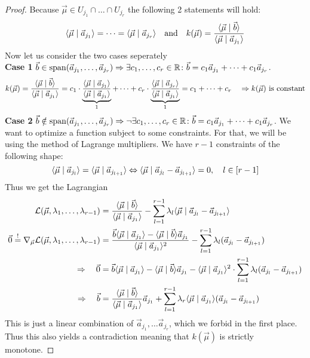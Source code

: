 \begin{proof}
    Because $\vec \mu \in U_{j_1}\cap \dots\cap U_{j_r}$ the following 2 statements will hold:
    $$\langle \vec{\mu} \mid \vec a_{j_1} \rangle = \dots = \langle \vec{\mu} \mid \vec a_{j_r} \rangle \quad\textrm{and}\quad k(\vec\mu) = \frac{\langle \vec \mu \mid \vec b \rangle}{\langle \vec \mu \mid \vec a_{j_1} \rangle}$$
    Now let us consider the two cases seperately\\
    \textbf{Case 1} $\vec b \in \operatorname{span}(\vec a_{j_1}, \dots, \vec a_{j_r}) \Rightarrow\exists c_1, \dots, c_r \in \mathbb{R}\colon \vec b = c_1\vec a_{j_1} + \dots + c_1\vec a_{j_r}$.
    $$k(\vec\mu) = \frac{\langle \vec \mu \mid \vec b \rangle}{\langle \vec \mu \mid \vec a_{j_1} \rangle} = c_1 \cdot \underbrace{\frac{\langle \vec \mu \mid \vec a_{j_1} \rangle}{\langle \vec \mu \mid \vec a_{j_1} \rangle}}_1 + \dots + c_r \cdot \underbrace{\frac{\langle \vec \mu \mid \vec a_{j_r} \rangle}{\langle \vec \mu \mid \vec a_{j_1} \rangle}}_1 = c_1 + \dots + c_r \quad \Rightarrow k(\vec\mu)\textrm{ is constant}$$
    \textbf{Case 2} $\vec b \notin \operatorname{span}(\vec a_{j_1}, \dots, \vec a_{j_r}) \Rightarrow\lnot\exists c_1, \dots, c_r \in \mathbb{R}\colon \vec b = c_1\vec a_{j_1} + \dots + c_1\vec a_{j_r}$. We want to optimize a function subject to some constraints. For that, we will be using the method of Lagrange multipliers. We have $r-1$ constraints of the following shape:
    $$\langle \vec\mu \mid \vec a_{j_l} \rangle = \langle \vec\mu \mid \vec a_{j_{l+1}} \rangle \Leftrightarrow \langle \vec\mu \mid \vec a_{j_l} - \vec a_{j_{l+1}} \rangle = 0, \quad l \in [r-1]$$
    Thus we get the Lagrangian
    \begin{align*}
        \mathcal{L}(\vec\mu, \lambda_1, \dots, \lambda_{r-1}) &= \frac{\langle \vec \mu \mid \vec b \rangle}{\langle \vec \mu \mid \vec a_{j_1} \rangle} - \sum_{l=1}^{r-1}\lambda_l \langle \vec\mu \mid \vec a_{j_l} - \vec a_{j_{l+1}} \rangle\\
        \vec0 \stackrel{!}{=}\nabla_{\vec \mu} \mathcal{L}(\vec\mu, \lambda_1, \dots, \lambda_{r-1}) &= \frac{\vec b\langle \vec\mu \mid \vec a_{j_{1}} \rangle - \langle \vec\mu \mid \vec b \rangle\vec a_{j_{1}}}{\langle \vec\mu \mid \vec a_{j_{1}} \rangle^2} - \sum_{l=1}^{r-1}\lambda_l(\vec a_{j_l} - \vec a_{j_{l+1}}) \\
        \Rightarrow\quad \vec0 &= \vec b\langle \vec\mu \mid \vec a_{j_{1}} \rangle - \langle \vec\mu \mid \vec b \rangle\vec a_{j_{1}} - \langle \vec\mu \mid \vec a_{j_{1}} \rangle^2\cdot\sum_{l=1}^{r-1}\lambda_l(\vec a_{j_l} - \vec a_{j_{l+1}})\\
        \Rightarrow\quad \vec b &= \frac{\langle \vec \mu \mid \vec b \rangle}{\langle \vec \mu \mid \vec a_{j_{1}} \rangle}\vec a_{j_{1}} + \sum_{l=1}^{r-1} \lambda_r \langle \vec\mu \mid \vec a_{j_{1}} \rangle(\vec a_{j_l} - \vec a_{j_{l+1}})
    \end{align*}
    This is just a linear combination of $\vec a_{j_1}, \dots \vec a_{j_r}$, which we forbid in the first place. Thus this also yields a contradiction meaning that $k(\vec\mu)$ is strictly monotone.
\end{proof}

